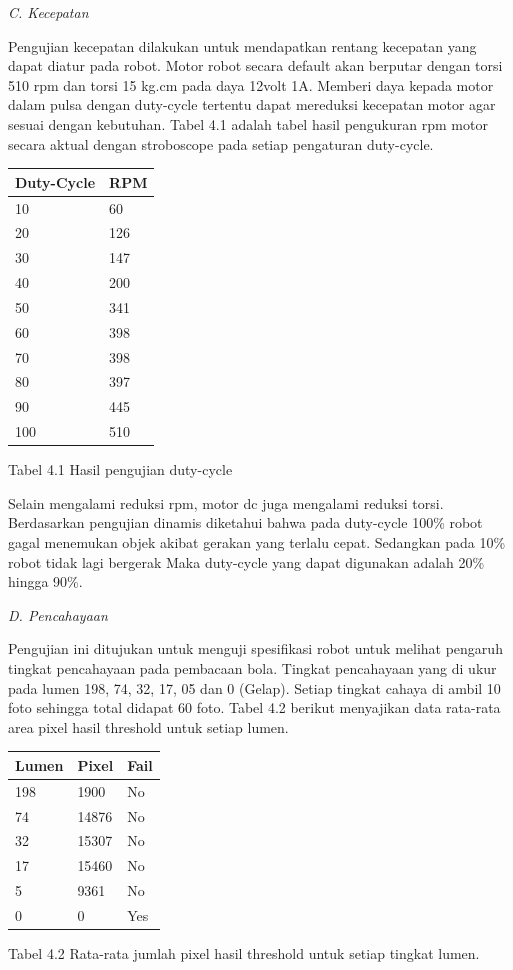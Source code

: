 \documentclass[10pt,journal,compsoc]{IEEEtran}
\begin{document}
  \noindent \textit{C. Kecepatan}
  
  Pengujian kecepatan dilakukan untuk mendapatkan rentang kecepatan yang dapat diatur pada robot. 
  Motor robot secara default akan berputar dengan torsi 510 rpm dan torsi 15 kg.cm pada daya 12volt 1A. 
  Memberi daya kepada motor dalam pulsa dengan duty-cycle tertentu dapat mereduksi kecepatan motor agar sesuai dengan kebutuhan. 
  Tabel 4.1 adalah tabel hasil pengukuran rpm motor secara aktual dengan stroboscope pada setiap pengaturan duty-cycle.
  
  \begin{center}
   \begin{tabular}{ |l|l| }
    \hline
    Duty-Cycle & RPM\\
   \hline
    10 & 60\\
    20 & 126\\
    30 & 147\\
    40 & 200\\
    50 & 341\\
    60 & 398\\
    70 & 398\\
    80 & 397\\
    90 & 445\\
    100 & 510\\
    \hline
   \end{tabular}
   
  Tabel 4.1 Hasil pengujian duty-cycle
  \end{center}
  
  Selain mengalami reduksi rpm, motor dc juga mengalami reduksi torsi. 
  Berdasarkan pengujian dinamis diketahui bahwa pada duty-cycle 100\% robot gagal menemukan objek akibat gerakan yang terlalu cepat.
  Sedangkan pada 10\% robot tidak lagi bergerak
  Maka duty-cycle yang dapat digunakan adalah 20\% hingga 90\%.
  
  \noindent \textit{D. Pencahayaan}
  
  Pengujian ini ditujukan untuk menguji spesifikasi robot untuk melihat pengaruh tingkat pencahayaan pada pembacaan bola.
  Tingkat pencahayaan yang di ukur pada lumen 198, 74, 32, 17, 05 dan 0 (Gelap). 
  Setiap tingkat cahaya di ambil 10 foto sehingga total didapat 60 foto.
  Tabel 4.2 berikut menyajikan data rata-rata area pixel hasil threshold untuk setiap lumen.
  
    \begin{center}
   \begin{tabular}{ |l|l|l| }
    \hline
    Lumen & Pixel & Fail\\
   \hline
    198 & 1900 & No\\ 
    74 & 14876 & No\\
    32 & 15307 & No\\
    17 & 15460 & No\\
    5 & 9361 & No\\
    0 & 0 & Yes\\
    \hline
   \end{tabular}
  
  Tabel 4.2 Rata-rata jumlah pixel hasil threshold untuk setiap tingkat lumen.
 
  \end{center}
  
\end{document}
